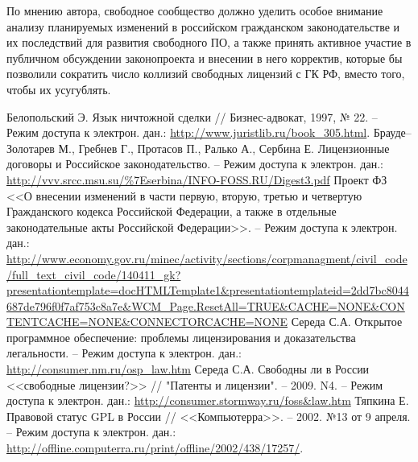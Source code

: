 \documentclass[10pt, a5paper]{article}
\begin{document}
По мнению автора, свободное сообщество должно уделить особое внимание анализу планируемых изменений в российском гражданском законодательстве и их последствий для развития свободного ПО, а также принять активное участие в публичном обсуждении законопроекта и внесении в него корректив, которые бы позволили сократить число коллизий свободных лицензий с ГК РФ, вместо того, чтобы их усугублять.

\begin{thebibliography}{9}

	 Белопольский Э. Язык ничтожной сделки // Бизнес-адвокат, 1997, № 22. – Режим доступа к электрон. дан.: \url{http://www.juristlib.ru/book_305.html}.
	 Брауде–Золотарев М., Гребнев Г., Протасов П., Ралько А., Сербина Е. Лицензионные договоры и Российское законодательство. – Режим доступа к электрон. дан.: \url{http://vvv.srcc.msu.su/%7Eserbina/INFO-FOSS.RU/Digest3.pdf}
	 Проект ФЗ <<О внесении изменений в части первую, вторую, третью и четвертую Гражданского кодекса Российской Федерации, а также в отдельные законодательные акты Российской Федерации>>. – Режим доступа к электрон. дан.: \url{http://www.economy.gov.ru/minec/activity/sections/corpmanagment/civil_code/full_text_civil_code/140411_gk?presentationtemplate=docHTMLTemplate1&presentationtemplateid=2dd7bc8044687de796f0f7af753c8a7e&WCM_Page.ResetAll=TRUE&CACHE=NONE&CONTENTCACHE=NONE&CONNECTORCACHE=NONE}
	 Середа С.А. Открытое программное обеспечение: проблемы лицензирования и доказательства легальности. – Режим доступа к электрон. дан.: \url{http://consumer.nm.ru/osp_law.htm}
	 Середа С.А. Свободны ли в России <<свободные лицензии?>> // "Патенты и лицензии". – 2009. N4. – Режим доступа к электрон. дан.: \url{http://consumer.stormway.ru/foss&law.htm}
	 Тяпкина Е. Правовой статус GPL в России // <<Компьютерра>>. – 2002. №13 от 9 апреля. – Режим доступа к электрон. дан.: \url{http://offline.computerra.ru/print/offline/2002/438/17257/}.
\end{thebibliography}
\end{document}
